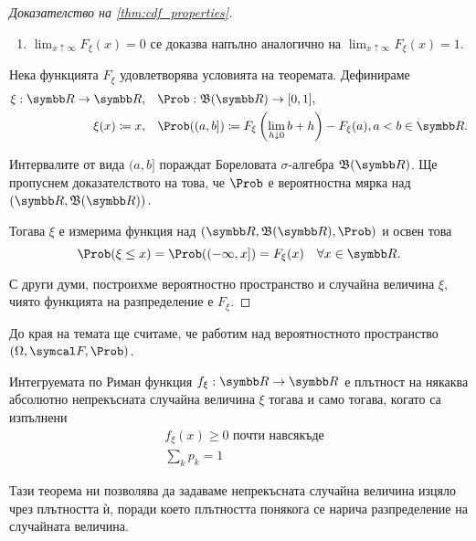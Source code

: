 \documentclass[
  headings=standardclasses,
  bibliography=totocnumbered,
]{scrartcl}
\begin{document}
\begin{proof}[Доказателство на \cref{thm:cdf_properties}]
\begin{enumerate}
    \item \( \lim_{x \uparrow \infty} F_\xi(x) = 0 \) се доказва напълно аналогично на \( \lim_{x \uparrow \infty} F_\xi(x) = 1 \).
  \end{enumerate}

  \Necessity Нека функцията \( F_\xi \) удовлетворява условията на теоремата. Дефинираме
  \begin{align*}
    \xi: \R \to \R,     &&& \Prob: \BorelAlgebra(\R) \to [0, 1], \\
    \xi(x) \coloneqq x, &&& \Prob((a, b]) \coloneqq F_\xi \left(\lim_{h \downarrow 0} b + h \right) - F_\xi(a), a < b \in \R.
  \end{align*}

  Интервалите от вида \( (a, b] \) пораждат Бореловата \( \sigma \)-алгебра \( \BorelAlgebra(\R) \). Ще пропуснем доказателството на това, че \( \Prob \) е вероятностна мярка над \( (\R, \BorelAlgebra(\R)) \).

  Тогава \( \xi \) е измерима функция над \( (\R, \BorelAlgebra(\R), \Prob) \) и освен това
  \begin{equation*}
    \Prob(\xi \leq x)
    =
    \Prob((-\infty, x])
    =
    F_\xi(x)\quad\forall x \in \R.
  \end{equation*}

  С други думи, построихме вероятностно пространство и случайна величина \( \xi \), чиято функцията на разпределение е \( F_\xi \).
\end{proof}

До края на темата ще считаме, че работим над вероятностното пространство \( (\Omega, \F, \Prob) \).

\begin{theorem}\label{thm:density_properties}
  Интегруемата по Риман функция \( f_\xi: \R \to \R \) е плътност на някаква абсолютно непрекъсната случайна величина \( \xi \) тогава и само тогава, когато са изпълнени
  \begin{align}
    &f_\xi(x) \geq 0 \text{ почти навсякъде} \tag{неотрицателност}\label{thm:density_properties/nonnegative} \\
    &\sum_k p_k = 1 \tag{нормираност}\label{thm:density_properties/normed}
  \end{align}
\end{theorem}

Тази теорема ни позволява да задаваме непрекъсната случайна величина изцяло чрез плътността ѝ, поради което плътността понякога се нарича разпределение на случайната величина.
\end{document}
